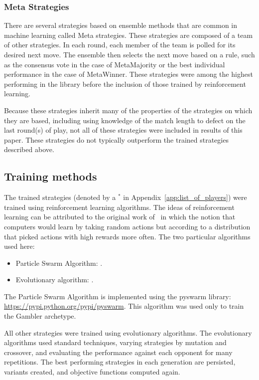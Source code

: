 \documentclass[10pt,letterpaper]{article}
\begin{document}
\subsubsection*{Meta Strategies}

There are several strategies based on ensemble methods that
are common in machine learning called Meta strategies. These strategies are
composed of a team of other strategies. In each round, each member of the team
is polled for its desired next
move. The ensemble then selects the next move based on a rule, such as the
consensus vote in the case of MetaMajority or the best individual performance
in the case of MetaWinner. These strategies were among the highest performing in 
the library before the inclusion of those trained by reinforcement learning. 

Because these strategies inherit many of the properties of the strategies
on which they are based, including using knowledge of the match length to defect
on the last round(s) of play, not all of these
strategies were included in results of this
paper. These strategies do not typically outperform the trained strategies
described above.

\subsection*{Training methods}\label{sec:methods}

The trained strategies (denoted by a \(^{*}\) in
Appendix~\ref{app:list_of_players}) were trained using reinforcement
learning algorithms. The ideas of reinforcement learning can be attributed to
the original work of~\cite{turing1950computing} in which the notion that
computers would learn by taking random actions but according to a distribution
that picked actions with high rewards more often. The two particular algorithms
used here:

\begin{itemize}
    \item Particle Swarm Algorithm: \cite{imran2013overview}.
    \item Evolutionary algorithm: \cite{moriarty1999evolutionary}.
\end{itemize}

The Particle Swarm Algorithm is implemented using the pyswarm library:
\url{https://pypi.python.org/pypi/pyswarm}. This algorithm was used only to
train the Gambler archetype.

All other strategies were trained using evolutionary algorithms. The
evolutionary algorithms used standard techniques, varying strategies by
mutation and crossover, and evaluating the performance against each opponent
for many repetitions. The best performing strategies in each generation are
persisted, variants created, and objective functions computed again.
\end{document}
